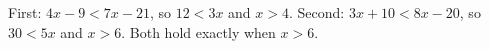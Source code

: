 First: $4x-9<7x-21$, so $12<3x$ and $x>4$. Second: $3x+10<8x-20$, so $30<5x$ and $x>6$. Both hold exactly when $\boxed{x>6}$.
